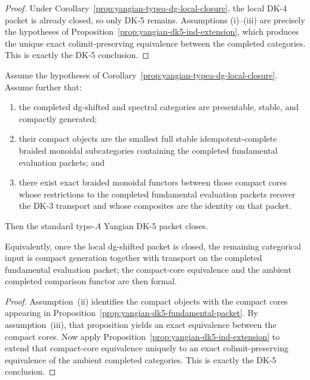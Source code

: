 \begin{proof}
Under
Corollary~\ref{prop:yangian-typea-dg-local-closure}, the local DK-4
packet is already closed, so only DK-5 remains. Assumptions
\textup{(i)}--\textup{(iii)} are precisely the hypotheses of
Proposition~\ref{prop:yangian-dk5-ind-extension}, which produces the
unique exact colimit-preserving equivalence between the completed
categories. This is exactly the DK-5 conclusion.
\end{proof}

\begin{corollary}
\label{cor:yangian-dk5-fundamental-packet}
Assume the hypotheses of
Corollary~\ref{prop:yangian-typea-dg-local-closure}. Assume further
that:
\begin{enumerate}[label=\textup{(\roman*)}]
\item the completed dg-shifted and spectral categories are presentable,
 stable, and compactly generated;
\item their compact objects are the smallest full stable
 idempotent-complete braided monoidal subcategories containing the
 completed fundamental evaluation packets; and
\item there exist exact braided monoidal functors between those compact
 cores whose restrictions to the completed fundamental evaluation
 packets recover the DK-3 transport and whose composites are the
 identity on that packet.
\end{enumerate}
Then the standard type-$A$ Yangian DK-5 packet closes.

Equivalently, once the local dg-shifted packet is closed, the remaining
categorical input is compact generation together with transport on the
completed fundamental evaluation packet; the compact-core equivalence
and the ambient completed comparison functor are then formal.
\end{corollary}

\begin{proof}
Assumption~\textup{(ii)} identifies the compact objects with the
compact cores appearing in
Proposition~\ref{prop:yangian-dk5-fundamental-packet}. By
assumption~\textup{(iii)}, that proposition yields an exact
equivalence between the compact cores. Now apply
Proposition~\ref{prop:yangian-dk5-ind-extension} to extend that
compact-core equivalence uniquely to an exact colimit-preserving
equivalence of the ambient completed categories. This is exactly the
DK-5 conclusion.
\end{proof}


